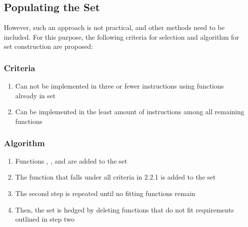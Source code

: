 \documentclass[11pt,nonacm,natbib=false]{acmart}
\begin{document}
\subsection{Populating the Set}
However, such an approach is not practical, and other methods need to be  included. For this purpose, the following criteria for selection and algorithm for set construction are proposed:
\subsubsection{Criteria}
\begin{enumerate}
    \item Can not be implemented in three or fewer instructions using functions already in set
    \item Can be implemented in the least amount of instructions among all remaining functions
\end{enumerate}
\subsubsection{Algorithm}
\begin{enumerate}
    \item Functions , , and  are added to the set
    \item The function that falls under all criteria in 2.2.1 is added to the set
    \item The second step is repeated until no fitting functions remain
    \item Then, the set is hedged by deleting functions that do not fit requirements outlined in step two
\end{enumerate}
\end{document}
